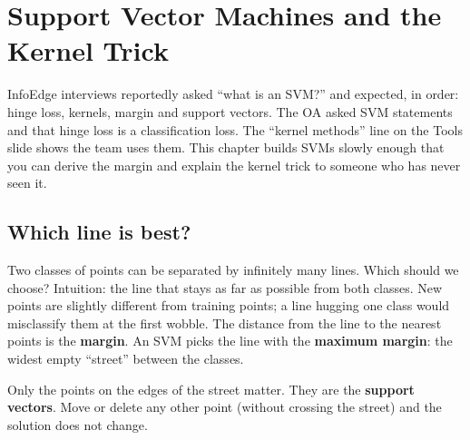 \chapter{Support Vector Machines and the Kernel Trick}

InfoEdge interviews reportedly asked ``what is an SVM?'' and expected, in order: hinge loss, kernels, margin and support
vectors. The OA asked SVM statements and that hinge loss is a classification loss. The ``kernel methods'' line on the
Tools slide shows the team uses them. This chapter builds SVMs slowly enough that you can derive the margin and
explain the kernel trick to someone who has never seen it.

\section{Which line is best?}
Two classes of points can be separated by infinitely many lines. Which should we choose? Intuition: the line that stays as
far as possible from both classes. New points are slightly different from training points; a line hugging one class would
misclassify them at the first wobble. The distance from the line to the nearest points is the \textbf{margin}. An SVM picks
the line with the \textbf{maximum margin}: the widest empty ``street'' between the classes.

\begin{center}
\end{center}

Only the points on the edges of the street matter. They are the \textbf{support vectors}. Move or delete any other point
(without crossing the street) and the solution does not change.


